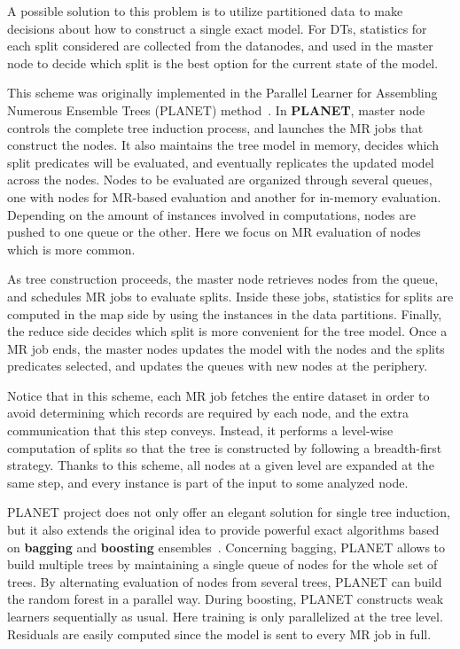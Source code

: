 \documentclass[3p,review]{elsarticle}
\begin{document}
A possible solution to this problem is to utilize partitioned data to make decisions about how to construct a single exact model. For DTs, statistics for each split considered are collected from the datanodes, and used in the master node to decide which split is the best option for the current state of the model.

This scheme was originally implemented in the Parallel Learner for Assembling Numerous
Ensemble Trees (PLANET) method~\cite{Panda09-DT-RF}. In \textbf{PLANET}, master node controls the complete tree induction process, and launches the MR jobs that construct the nodes. It also maintains the tree model in memory, decides which split predicates will be evaluated, and eventually replicates the updated model across the nodes. Nodes to be evaluated are organized through several queues, one with nodes for MR-based evaluation and another for in-memory evaluation. Depending on the amount of instances involved in computations, nodes are pushed to one queue or the other. Here we focus on MR evaluation of nodes which is more common.

As tree construction proceeds, the master node retrieves nodes from the queue, and schedules MR jobs to evaluate splits. Inside these jobs, statistics for splits are computed in the map side by using the instances in the data partitions. Finally, the reduce side decides which split is more convenient for the tree model. Once a MR job ends, the master nodes updates the model with the nodes and the splits predicates selected, and updates the queues with new nodes at the periphery.

Notice that in this scheme, each MR job fetches the entire dataset in order to avoid determining which records are required by each node, and the extra communication that this step conveys. Instead, it performs a level-wise computation of splits so that the tree is constructed by following a breadth-first strategy. Thanks to this scheme, all nodes at a given level are expanded at the same step, and every instance is part of the input to some analyzed node.

PLANET project does not only offer an elegant solution for single tree induction, but it also extends the original idea to provide powerful exact algorithms based on \textbf{bagging} and \textbf{boosting} ensembles~\cite{hastie11}. Concerning bagging, PLANET allows to build multiple trees by maintaining a single queue of nodes for the whole set of trees. By alternating evaluation of nodes from several trees, PLANET can build the random forest in a parallel way. During boosting, PLANET constructs weak learners sequentially as usual. Here training is only parallelized at the tree level. Residuals are easily computed since the model is sent to every MR job in full.
\end{document}
